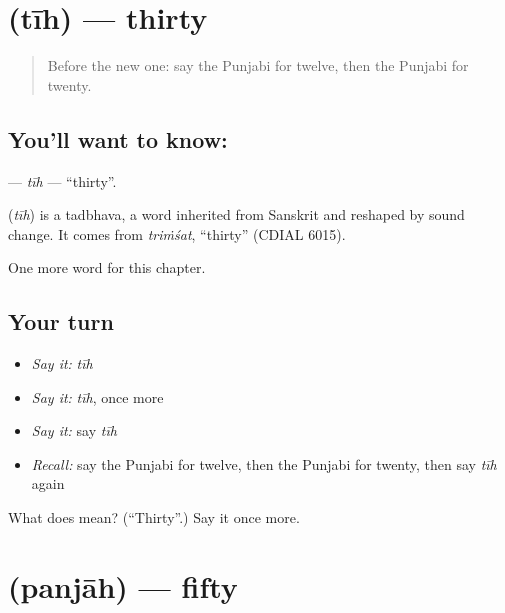 \section[\texorpdfstring{\pa{ਤੀਹ} (tīh)}{ਤੀਹ (tīh)}]{ (tīh) — thirty}

\label{lesson:PA-C96-tih}



\begin{quote}
Before the new one: say the Punjabi for twelve, then the Punjabi for twenty.
\end{quote}

\subsection*{You'll want to know: }
\textbf{} — \emph{tīh} — \textquotedblleft{}thirty\textquotedblright{}.

\begin{cousinweb}
\textbf{} (\emph{tīh}) is a tadbhava, a word inherited from Sanskrit and reshaped by sound change. It comes from \emph{triṁśat}, \textquotedblleft{}thirty\textquotedblright{} (CDIAL 6015).
\end{cousinweb}

\begin{grammarlens}[title={What you've built}]
One more word for this chapter.
\end{grammarlens}

\subsection*{Your turn}
\begin{itemize}
\raggedright
  \item \emph{Say it:} \emph{tīh}
  \item \emph{Say it:} \emph{tīh}, once more
  \item \emph{Say it:} say \emph{tīh}
  \item \emph{Recall:} say the Punjabi for twelve, then the Punjabi for twenty, then say \emph{tīh} again
\end{itemize}

\begin{tcolorbox}[breakable,colback=teal!4,colframe=teal!35!black,title={Before you move on}]
What does  mean? (\textquotedblleft{}Thirty\textquotedblright{}.) Say it once more.
\end{tcolorbox}
\section[\texorpdfstring{\pa{ਪੰਜਾਹ} (panjāh)}{ਪੰਜਾਹ (panjāh)}]{ (panjāh) — fifty}

